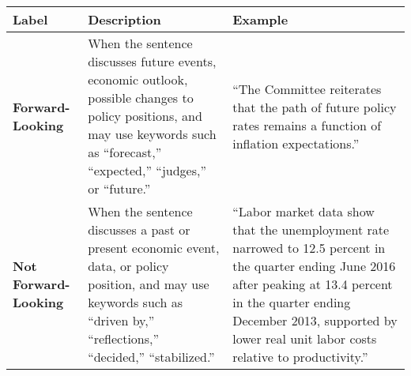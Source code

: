 \begin{table*}
    \caption{}
    \vspace{1em}
    \begin{tabular}{p{}p{}p{}}
    \toprule
    \textbf{Label} & \textbf{Description} & \textbf{Example} \\
    \midrule
    \textbf{Forward-Looking} & When the sentence discusses future events, economic outlook, possible changes to policy positions, and may use keywords such as “forecast,” “expected,” “judges,” or “future.” & “The Committee reiterates that the path of future policy rates remains a function of inflation expectations.” \\
    \midrule
    \textbf{Not Forward-Looking} & When the sentence discusses a past or present economic event, data, or policy position, and may use keywords such as “driven by,” “reflections,” “decided,” “stabilized.” & “Labor market data show that the unemployment rate narrowed to 12.5 percent in the quarter ending June 2016 after peaking at 13.4 percent in the quarter ending December 2013, supported by lower real unit labor costs relative to productivity.” \\
    \bottomrule
    \end{tabular}
    \label{tb:cbe_forward_looking_guide}
    \end{table*}
